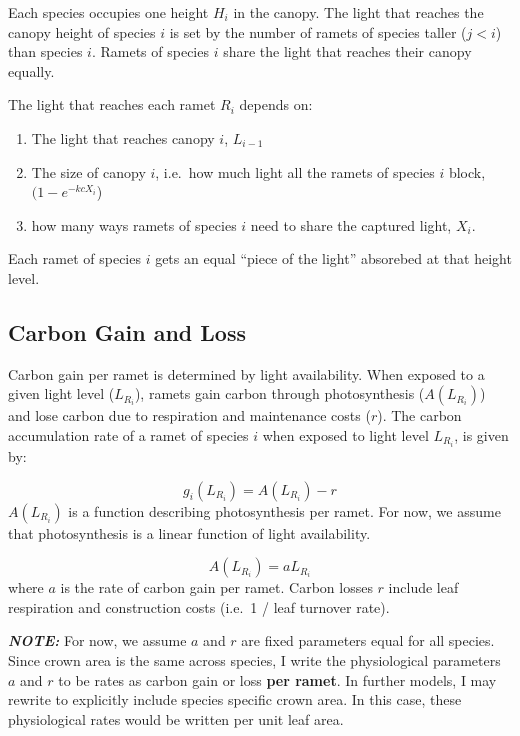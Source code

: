 \documentclass[
]{article}
\providecommand{\tightlist}{%
  \setlength{\itemsep}{0pt}\setlength{\parskip}{0pt}}
\begin{document}
Each species occupies one height \(H_i\) in the canopy. The light that
reaches the canopy height of species \(i\) is set by the number of
ramets of species taller (\(j < i\)) than species \(i\). Ramets of
species \(i\) share the light that reaches their canopy equally.

The light that reaches each ramet \(R_i\) depends on:

\begin{enumerate}
\def\labelenumi{\arabic{enumi}.}
\tightlist
\item
  The light that reaches canopy \(i\), \(L_{i-1}\)
\item
  The size of canopy \(i\), i.e.~how much light all the ramets of
  species \(i\) block, \((1 - e^{-kc X_i}\))
\item
  how many ways ramets of species \(i\) need to share the captured
  light, \(X_i\).
\end{enumerate}

Each ramet of species \(i\) gets an equal ``piece of the light''
absorebed at that height level.

\subsection{Carbon Gain and Loss}\label{carbon-gain-and-loss}

Carbon gain per ramet is determined by light availability. When exposed
to a given light level (\(L_{R_i}\)), ramets gain carbon through
photosynthesis (\(A(L_{R_i})\)) and lose carbon due to respiration and
maintenance costs (\(r\)). The carbon accumulation rate of a ramet of
species \(i\) when exposed to light level \(L_{R_i}\), is given by:

\[ g_i(L_{R_i}) = A(L_{R_i})  - r\] \(A(L_{R_i})\) is a function
describing photosynthesis per ramet. For now, we assume that
photosynthesis is a linear function of light availability.

\[A(L_{R_i}) = a L_{R_i}\] where \(a\) is the rate of carbon gain per
ramet. Carbon losses \(r\) include leaf respiration and construction
costs (i.e.~1 / leaf turnover rate).

\textbf{\emph{NOTE:}} For now, we assume \(a\) and \(r\) are fixed
parameters equal for all species. Since crown area is the same across
species, I write the physiological parameters \(a\) and \(r\) to be
rates as carbon gain or loss \textbf{per ramet}. In further models, I
may rewrite to explicitly include species specific crown area. In this
case, these physiological rates would be written per unit leaf area.
\end{document}
